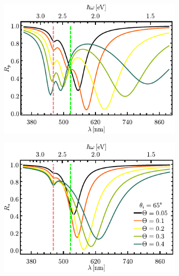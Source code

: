 \begin{figure}[b!]\centering\hspace*{-1.5em}
	\begin{subfigure}{.01\linewidth}\caption{}\label{sfig:R-ATR4-cutp}\vspace{4.5cm}\end{subfigure}
	\begin{subfigure}{.45\linewidth}\hspace*{-1.5em}
	\includegraphics[scale=1]{2-Resultados/figs/1-Wp4ThetaVar/cut_angle_65_p.pdf}\end{subfigure}
	\begin{subfigure}{.01\linewidth}\caption{}\label{sfig:R-ATR4-cuts}\vspace{4.5cm}\end{subfigure}\hspace*{-1.em}
	\begin{subfigure}{.45\linewidth}\centering
	\includegraphics[scale=1 ]{2-Resultados/figs/1-Wp4ThetaVar/cut_angle_65_s.pdf}\end{subfigure}\vspace*{-.7em}

\end{figure}
